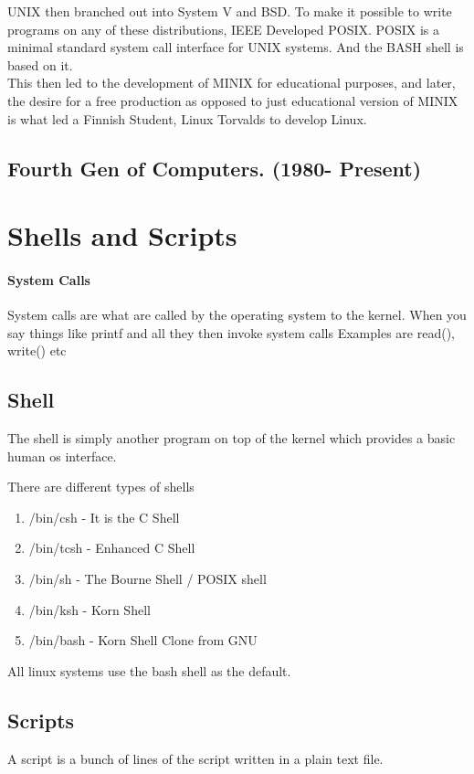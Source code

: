 \documentclass[11pt]{article}
\begin{document}
UNIX then branched out into System V and BSD. To make it possible to write programs on any of these distributions, IEEE Developed POSIX. POSIX is a minimal standard system call interface for UNIX systems. And the BASH shell is based on it. \\
This then led to the development of MINIX for educational purposes, and later, the desire for a free production as opposed to just educational version of MINIX is what led a Finnish Student, Linux Torvalds to develop Linux.

\subsection{Fourth Gen of Computers. (1980- Present)}




\section{Shells and Scripts}

\paragraph{System Calls}

System calls are what are called by the operating system to the kernel. When you say things like printf and all they then invoke system calls
Examples are read(), write() etc

\subsection{Shell}
The shell is simply another program on top of the kernel which provides a basic human os interface.

There are different types of shells

\begin{enumerate}
	\item /bin/csh - It is the C Shell
	\item /bin/tcsh - Enhanced C Shell
	\item /bin/sh - The Bourne Shell / POSIX shell
	\item /bin/ksh - Korn Shell
	\item /bin/bash - Korn Shell Clone from GNU
\end{enumerate}

All linux systems use the bash shell as the default.

\subsection{Scripts}
A script is a bunch of lines of the script written in a plain text file.
\end{document}
